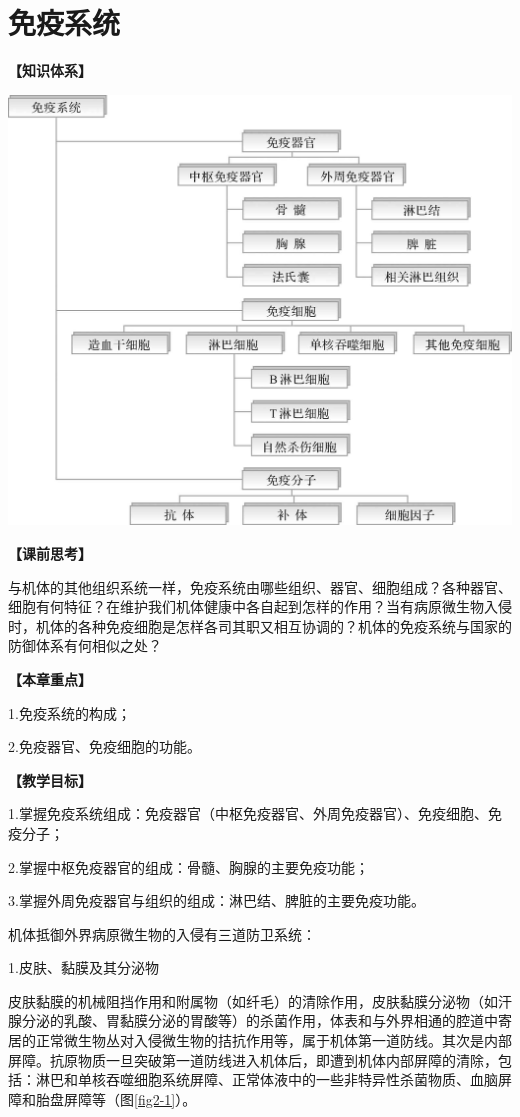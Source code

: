 \chapter{免疫系统}
\begin{framed}
\noindent\textbf{【知识体系】}

\begin{center}
\includegraphics[width=.66\textwidth]{./images/Image00025.jpg}
\end{center}

\noindent\textbf{【课前思考】}

与机体的其他组织系统一样，免疫系统由哪些组织、器官、细胞组成？各种器官、细胞有何特征？在维护我们机体健康中各自起到怎样的作用？当有病原微生物入侵时，机体的各种免疫细胞是怎样各司其职又相互协调的？机体的免疫系统与国家的防御体系有何相似之处？

\noindent\textbf{【本章重点】}

1.免疫系统的构成；

2.免疫器官、免疫细胞的功能。

\noindent\textbf{【教学目标】}

1.掌握免疫系统组成：免疫器官（中枢免疫器官、外周免疫器官）、免疫细胞、免疫分子；

2.掌握中枢免疫器官的组成：骨髓、胸腺的主要免疫功能；

3.掌握外周免疫器官与组织的组成：淋巴结、脾脏的主要免疫功能。
\end{framed}
机体抵御外界病原微生物的入侵有三道防卫系统：

1.皮肤、黏膜及其分泌物

皮肤黏膜的机械阻挡作用和附属物（如纤毛）的清除作用，皮肤黏膜分泌物（如汗腺分泌的乳酸、胃黏膜分泌的胃酸等）的杀菌作用，体表和与外界相通的腔道中寄居的正常微生物丛对入侵微生物的拮抗作用等，属于机体第一道防线。其次是内部屏障。抗原物质一旦突破第一道防线进入机体后，即遭到机体内部屏障的清除，包括：淋巴和单核吞噬细胞系统屏障、正常体液中的一些非特异性杀菌物质、血脑屏障和胎盘屏障等（图\ref{fig2-1}）。

